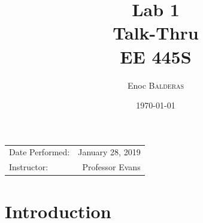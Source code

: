 \documentclass{article}
\title{Lab 1\\ Talk-Thru\\ EE 445S} %
\author{Enoc \textsc{Balderas}} %
\date{\today} %
\begin{document}
\maketitle %

\begin{center}
\begin{tabular}{l r}
Date Performed: & January 28, 2019 \\ %
Instructor: & Professor Evans %
\end{tabular}
\end{center}



\section{Introduction}
\end{document}
